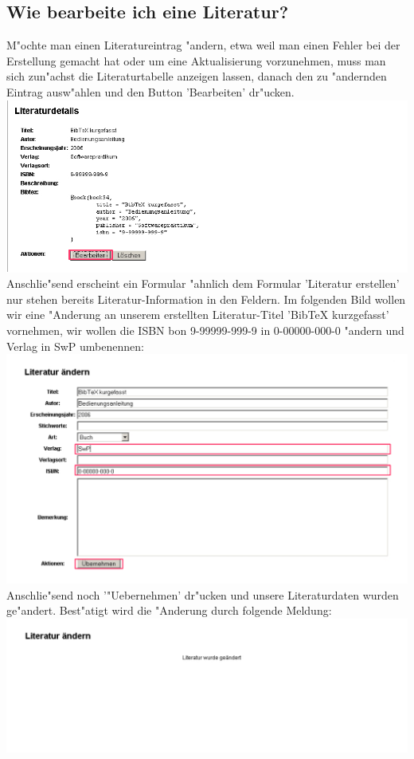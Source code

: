 \subsection{Wie bearbeite ich eine Literatur?}
M"ochte man einen Literatureintrag "andern, etwa weil man einen Fehler bei der Erstellung gemacht hat oder um eine Aktualisierung vorzunehmen, muss man sich zun"achst die Literaturtabelle anzeigen lassen, danach den zu "andernden Eintrag ausw"ahlen und den Button 'Bearbeiten' dr"ucken.\\
\includegraphics[scale=0.8]{bearb1}\\
Anschlie"send erscheint ein Formular "ahnlich dem Formular 'Literatur erstellen' nur stehen bereits Literatur-Information in den Feldern.
Im folgenden Bild wollen wir eine "Anderung an unserem erstellten Literatur-Titel 'BibTeX kurzgefasst' vornehmen, wir wollen die ISBN bon 9-99999-999-9 in 0-00000-000-0 "andern und Verlag in SwP umbenennen:\\
\includegraphics[scale=0.8]{bearb2}\\
Anschlie"send noch '"Uebernehmen' dr"ucken und unsere Literaturdaten wurden ge"andert. Best"atigt wird die "Anderung durch folgende Meldung:\\
\includegraphics[scale=0.8]{bearb3}\\

